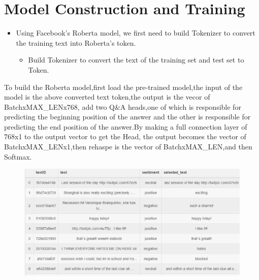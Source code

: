 \documentclass[
 size=14pt,
 paper=smartboard,  %
 mode=present, 		%
 display=slides, 	%
 style=tuliplab,  	%
 pauseslide,
 fleqn,leqno]{powerdot}
\begin{document}


\section{Model Construction and Training} 



\begin{slide}{}
  \begin{itemize}
    \item Using Facebook's Roberta model, we first need to build Tokenizer to convert the training text into Roberta's token.
    \begin{itemize}
      \item Build Tokenizer to convert the text of the training set and test set to Token.
    \end{itemize}
  \end{itemize}
  

  \bigskip
  To build the Roberta model,first load the pre-trained model,the input of the model 
is the above converted text token,the output is the vecor of BatchxMAX_LENx768, 
  add two Q\&A heads,one of which is responsible for predicting 
   the beginning position of the answer and the other is responsible 
   for predicting the end position of the answer.By making 
   a full connection layer of 768x1 to the output vector to get the Head,
   the output becomes the vector of BatchxMAX_LENx1,then rehaspe is the 
   vector of BatchxMAX_LEN,and then Softmax.
 
\end{slide}

\begin{slide}{}
  \begin{figure}
    \centering
    \includegraphics[width=1\textwidth]{kaggle/1.9.eps}
  \end{figure}
\end{slide}













\end{document}
